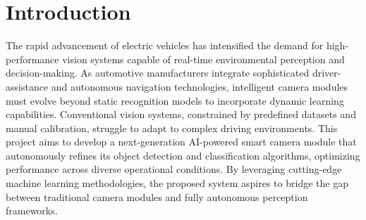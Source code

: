 \documentclass[journal,transmag]{IEEEtran}
\begin{document}
%



\section{Introduction}
% 
% 
% 
% 


\IEEEPARstart
The rapid advancement of electric vehicles has intensified the demand for high-performance vision systems capable of real-time environmental perception and decision-making. As automotive manufacturers integrate sophisticated driver-assistance and autonomous navigation technologies, intelligent camera modules must evolve beyond static recognition models to incorporate dynamic learning capabilities. Conventional vision systems, constrained by predefined datasets and manual calibration, struggle to adapt to complex driving environments. This project aims to develop a next-generation AI-powered smart camera module that autonomously refines its object detection and classification algorithms, optimizing performance across diverse operational conditions. By leveraging cutting-edge machine learning methodologies, the proposed system aspires to bridge the gap between traditional camera modules and fully autonomous perception frameworks.
\end{document}
